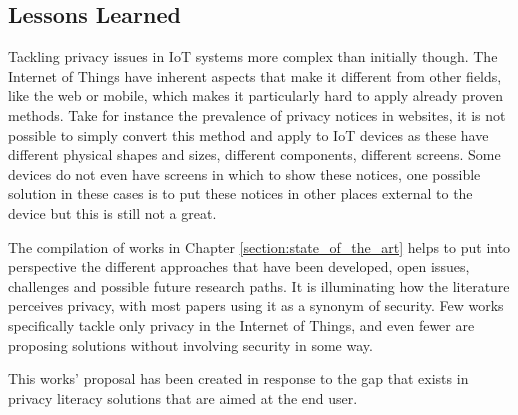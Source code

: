 \subsection{Lessons Learned}

Tackling privacy issues in IoT systems more complex than initially though.
The Internet of Things have inherent aspects that make it different from
other fields, like the web or mobile, which makes it particularly hard
to apply already proven methods. Take for instance the prevalence of
privacy notices in websites, it is not possible to simply convert this
method and apply to IoT devices as these have different physical shapes and sizes,
different components, different screens. Some devices do not even have screens
in which to show these notices, one possible solution in these cases is to
put these notices in other places external to the device but this is still not
a great.

The compilation of works in Chapter \ref{section:state_of_the_art} helps
to put into perspective the different approaches that have been developed,
open issues, challenges and possible future research paths. It is illuminating
how the literature perceives privacy, with most papers using it as a synonym of security.
Few works specifically tackle only privacy in the Internet of Things, and even fewer
are proposing solutions without involving security in some way.

This works' proposal has been created in response to the gap that exists
in privacy literacy solutions that are aimed at the end user.
